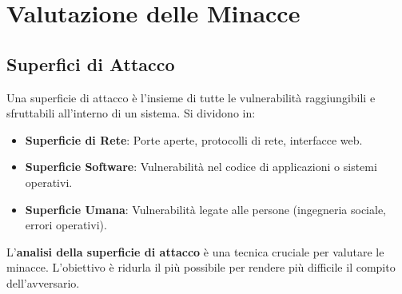 \section{Valutazione delle Minacce}

\subsection{Superfici di Attacco}
Una superficie di attacco è l'insieme di tutte le vulnerabilità raggiungibili e sfruttabili all'interno di un sistema. Si dividono in:
\begin{itemize}
    \item \textbf{Superficie di Rete}: Porte aperte, protocolli di rete, interfacce web.
    \item \textbf{Superficie Software}: Vulnerabilità nel codice di applicazioni o sistemi operativi.
    \item \textbf{Superficie Umana}: Vulnerabilità legate alle persone (ingegneria sociale, errori operativi).
\end{itemize}



L'\textbf{analisi della superficie di attacco} è una tecnica cruciale per valutare le minacce. L'obiettivo è ridurla il più possibile per rendere più difficile il compito dell'avversario.

